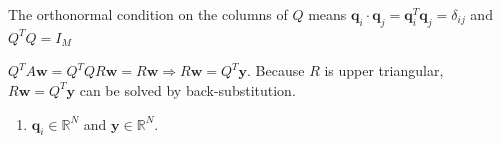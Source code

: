 \documentclass[12pt,letterpaper,noanswers]{exam}
\newcommand{\vc}[1]{\boldsymbol{#1}}
\begin{document}
The orthonormal condition on the columns of $Q$ means $\vc{q}_i\cdot \vc{q}_j = \vc{q}_i^T\vc{q}_j = \delta_{ij}$ and $Q^TQ = I_M$








$Q^TA\vc{w} = Q^T Q R\vc{w} =  R\vc{w} \Rightarrow R\vc{w} = Q^T\vc{y}$.  Because $R$ is upper triangular, $R\vc{w} = Q^T\vc{y}$ can be solved by back-substitution.

\begin{enumerate}[resume=classQ]
\item $\vc{q}_i \in \mathbb{R}^N$ and $\vc{y}\in\mathbb{R}^N$.  

\end{enumerate}
\end{document}
